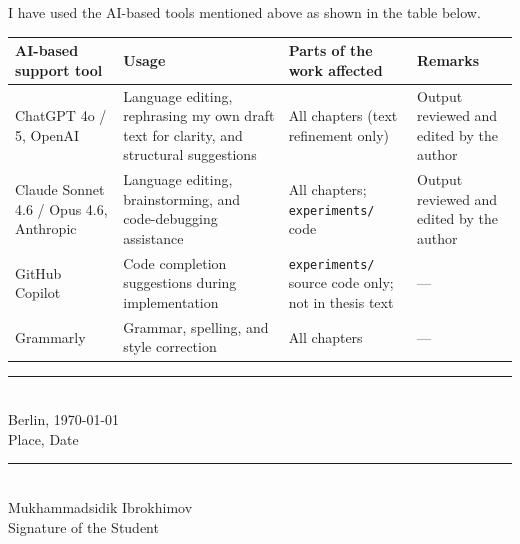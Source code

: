 \noindent I have used the AI-based tools mentioned above as shown in the table below.

\begin{table}[H]
\centering
\renewcommand{\arraystretch}{1.4}
\begin{tabular}{@{}p{3.0cm} p{4.2cm} p{3.6cm} p{2.6cm}@{}}
\toprule
\textbf{AI-based support tool} & \textbf{Usage} & \textbf{Parts of the work affected} & \textbf{Remarks} \\
\midrule
ChatGPT 4o / 5, OpenAI & Language editing, rephrasing my own draft text for clarity, and structural suggestions & All chapters (text refinement only) & Output reviewed and edited by the author \\
Claude Sonnet 4.6 / Opus 4.6, Anthropic & Language editing, brainstorming, and code-debugging assistance & All chapters; \texttt{experiments/} code & Output reviewed and edited by the author \\
GitHub Copilot & Code completion suggestions during implementation & \texttt{experiments/} source code only; not in thesis text & --- \\
Grammarly & Grammar, spelling, and style correction & All chapters & --- \\
\bottomrule
\end{tabular}
\end{table}

\vfill

\noindent
\begin{minipage}[t]{0.45\textwidth}
\rule{\textwidth}{0.4pt}\\
Berlin, \today\\[0.1cm]
{\small Place, Date}
\end{minipage}
\hfill
\begin{minipage}[t]{0.45\textwidth}
\rule{\textwidth}{0.4pt}\\
Mukhammadsidik Ibrokhimov\\[0.1cm]
{\small Signature of the Student}
\end{minipage}

\clearpage
